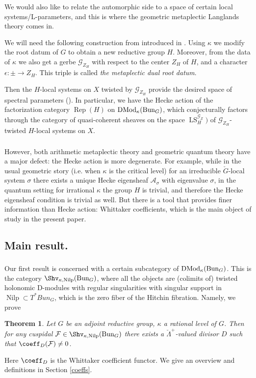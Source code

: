 \documentclass[9pt]{amsart}
\newcommand{\cA}{{\mathcal A}}
\newcommand{\cF}{{\mathcal F}}
\newcommand{\cG}{{\mathcal G}}
\newtheorem{thm}[subsubsection]{Theorem}
\DeclareMathOperator{\LocSys}{{LS}}
\DeclareMathOperator{\Nilp}{{Nilp}} \DeclareMathOperator{\op}{{op}}
\DeclareMathOperator{\Rep}{{Rep}}
\numberwithin{equation}{section}
\DeclareMathOperator{\D}{{DMod}}
\begin{document}
	\subsubsection{}  We would also like to relate the automorphic side to a space of certain local systems/L-parameters, and this is where the geometric metaplectic Langlands theory comes in. 
	
	We will need the following construction from introduced in \cite[Section 6]{GL}. Using $\kappa$ we modify the root datum of $G$ to obtain a new reductive group $H$. Moreover, from the data of $\kappa$ we also get a gerbe $\cG_{Z_H}$ with respect to the center $Z_H$ of $H$, and a character $\epsilon: \pm \rightarrow Z_H$. This triple is called \emph{the metaplectic dual root datum}. 
	
	Then the $H$-local systems on $X$ twisted by $\cG_{Z_H}$ provide the desired space of spectral parameters (\cite[9.6.6]{GL}). In particular, we have the Hecke action of the factorization category $\Rep(H)$ on $\D_{\kappa}(\Bun_G)$, which conjecturally factors through the category of quasi-coherent sheaves on the space $\LocSys_H^{\cG_Z})$ of $\cG_{Z_H}$-twisted $H$-local systems on $X$.
	
	\subsubsection{} However, both arithmetic metaplectic theory and geometric quantum theory have a major defect: the Hecke action is more degenerate. For example, while in the usual geometric story (i.e. when $\kappa$ is the critical level) for an irreducible $\check{G}$-local system $\sigma$ there exists a unique Hecke eigensheaf $\cA_{\sigma}$ with eigenvalue $\sigma$, in the quantum setting for irrational $\kappa$ the group $H$ is trivial, and therefore the Hecke eigensheaf condition is trivial as well. But there is a tool that provides finer information than Hecke action: Whittaker coefficients, which is the main object of study in the present paper. 
	\subsection{Main result.}
	
	\subsubsection{} Our first result is concerned with a certain subcategory of $\D_{\kappa}(\Bun_G)$. This is the category $\Shv_{\kappa, \Nilp}(\Bun_G)$, where all the objects are (colimits of) twisted holonomic D-modules with regular singularities with singular support in $\Nilp \subset T^*Bun_G$, which is the zero fiber of the Hitchin fibration. Namely, we prove 
	\begin{thm}\label{whitshvnilp}
		Let $G$ be an adjoint  reductive group, $\kappa$ a rational level of $G$. Then for any cuspidal $\cF \in \Shv_{\kappa, \Nilp}(\Bun_G)$ there exists a $\check{\Lambda}^+$-valued divisor $D$ such that $\coeff_D(\cF) \neq 0$.
	\end{thm}
Here $\coeff_D$ is the Whittaker coefficient functor. We give an overview and definitions in Section \ref{coeffs}.
	
\end{document}
